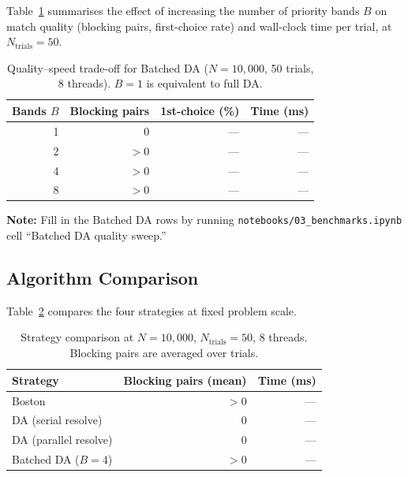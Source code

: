 \documentclass{article}
\theoremstyle{plain}
\theoremstyle{definition}
\theoremstyle{remark}
\begin{document}
Table~\ref{tab:batched} summarises the effect of increasing the number of
priority bands $B$ on match quality (blocking pairs, first-choice rate) and
wall-clock time per trial, at $N_\text{trials} = 50$.

\begin{table}[t]
\caption{Quality--speed trade-off for Batched DA ($N = 10{,}000$, 50 trials,
8 threads). $B = 1$ is equivalent to full DA.}
\label{tab:batched}
\vskip 0.15in
\begin{center}
\begin{small}
\begin{sc}
\begin{tabular}{rrrr}
\toprule
Bands $B$ & Blocking pairs & 1st-choice (\%) & Time (ms) \\
\midrule
 1 &     0 & --- & --- \\
 2 &  $>$0 & --- & --- \\
 4 &  $>$0 & --- & --- \\
 8 &  $>$0 & --- & --- \\
\bottomrule
\end{tabular}
\end{sc}
\end{small}
\end{center}
\vskip -0.1in
\end{table}

\textbf{Note:} Fill in the Batched DA rows by running
\texttt{notebooks/03\_benchmarks.ipynb} cell ``Batched DA quality sweep.''

\subsection{Algorithm Comparison}

Table~\ref{tab:algos} compares the four strategies at fixed problem scale.

\begin{table}[t]
\caption{Strategy comparison at $N = 10{,}000$, $N_\text{trials} = 50$,
8 threads. Blocking pairs are averaged over trials.}
\label{tab:algos}
\vskip 0.15in
\begin{center}
\begin{small}
\begin{sc}
\begin{tabular}{lrr}
\toprule
Strategy & Blocking pairs (mean) & Time (ms) \\
\midrule
Boston              & $>$0 & --- \\
DA (serial resolve) &    0 & --- \\
DA (parallel resolve) & 0 & --- \\
Batched DA ($B=4$)  & $>$0 & --- \\
\bottomrule
\end{tabular}
\end{sc}
\end{small}
\end{center}
\vskip -0.1in
\end{table}
\end{document}
